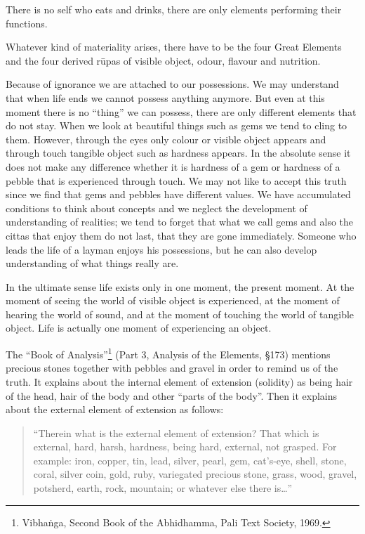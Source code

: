 \documentclass{book}
\begin{document}
There is no self who eats and drinks, there are only elements performing
their functions.

Whatever kind of materiality arises, there have to be the four Great
Elements and the four derived r\=upas of visible object, odour, flavour
and nutrition.

Because of ignorance we are attached to our possessions. We may
understand that when life ends we cannot possess anything anymore. But
even at this moment there is no ``thing'' we can possess, there are
only different elements that do not stay. When we look at beautiful
things such as gems we tend to cling to them. However, through the eyes
only colour or visible object appears and through touch tangible object
such as hardness appears. In the absolute sense it does not make any
difference whether it is hardness of a gem or hardness of a pebble that
is experienced through touch. We may not like to accept this truth
since we find that gems and pebbles have different values. We have
accumulated conditions to think about concepts and we neglect the
development of understanding of realities; we tend to forget that what
we call gems and also the cittas that enjoy them do not last, that they
are gone immediately. Someone who leads the life of a layman enjoys his
possessions, but he can also develop understanding of what things
really are. 

In the ultimate sense life exists only in one moment, the present
moment. At the moment of seeing the world of visible object is
experienced, at the moment of hearing the world of sound, and at the
moment of touching the world of tangible object. Life is actually one
moment of experiencing an object.

The ``Book of Analysis''\footnote{Vibha\.nga, Second Book of the
Abhidhamma, Pali Text Society, 1969.} (Part 3, Analysis of the
Elements, {\S}173) mentions precious stones together with pebbles and
gravel in order to remind us of the truth. It explains about the
internal element of extension (solidity) as being hair of the head,
hair of the body and other ``parts of the body''. Then it explains
about the external element of extension as follows:




\begin{quote}\begin{flushleft}
``Therein what is the external element of extension? That which is
external, hard, harsh, hardness, being hard, external, not grasped. For
example: iron, copper, tin, lead, silver, pearl, gem, cat's-eye,
shell, stone, coral, silver coin, gold, ruby, variegated precious
stone, grass, wood, gravel, potsherd, earth, rock, mountain; or
whatever else there is\ldots''

\end{flushleft}\end{quote}
\end{document}
